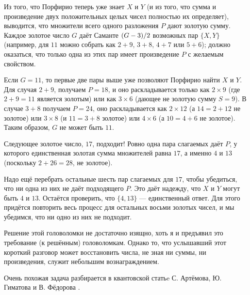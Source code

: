 Из того, что Порфирио теперь уже знает $X$ и $Y$ (и из того, что сумма и произведение двух положительных целых чисел полностью их определяет), выводится, что множители всего одного разложения $P$ дают золотую сумму. 
Каждое золотое число $G$ даёт Саманте $(G \z- 3)/2$ возможных пар $\{X, Y\}$
(например, для $11$ можно собрать как $2 + 9$, $3 + 8$, $4 + 7$ или $5 + 6$); должно оказаться, что только одна из этих пар имеет произведение $P$ с желаемым свойством.

Если $G = 11$, то первые две пары выше уже позволяют Порфирио найти $X$ и $Y$.
Для случая $2 + 9$, получаем $P = 18$, и оно раскладывается только как $2 \times 9$ (где $2 + 9 = 11$ является золотым) или как $3 \times 6$ (дающее не золотую сумму $S = 9$).
В случае $3 + 8$ получаем $P = 24$, оно раскладывается как $2 \times 12$ (а $14=2+12$ не золотое) или
$3 \times 8$ (и $11=3+8$ золотое) или $4 \times 6$ (а $10=4+6$ не золотое).
Таким образом, $G$ не может быть $11$.

Следующее золотое число, $17$, подходит!
Ровно одна пара слагаемых даёт $P$, у которого единственная золотая сумма множителей равна $17$, а именно $4$ и $13$ (поскольку $2 + 26 = 28$, не золотое).

Надо ещё перебрать остальные шесть пар слагаемых для $17$, чтобы убедиться, что ни одна из них не даёт подходящего $P$.
Это даёт надежду, что $X$ и $Y$ могут быть $4$ и $13$.
Остаётся проверить, что $\{4, 13\}$ --- единственный ответ.
Для этого придётся повторить весь процесс для остальных восьми золотых чисел, и мы убедимся, что ни одно из них не подходит.

Решение этой головоломки не достаточно изящно,
хоть я и предъявил это требование (к решённым) головоломкам.
Однако то, что услышавший этот короткий разговор может восстановить числа, не зная ни суммы, ни произведения, служит небольшим вознаграждением.

\begin{addedbytheeditors}
Очень похожая задача разбирается в квантовской статьe С. Артёмова, %
Ю. Гиматова %
и В. Фёдорова %
\cite{artemov-gimatov-fedorov}.\pr



\end{addedbytheeditors}

